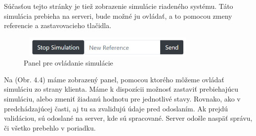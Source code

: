 Súčasťou tejto stránky je tiež zobrazenie simulácie riadeného systému. Táto simulácia prebieha na serveri, bude možné ju ovládať, a to pomocou zmeny referencie a zastavovacieho tlačidla.
\begin{figure}[H]	
	\centering
	\includegraphics[width=9cm,height=1cm]{images/ovladanie_simulacie}
	\caption{Panel pre ovládanie simulácie}
\end{figure}
Na (Obr. 4.4) máme zobrazený panel, pomocou ktorého môžeme ovládať simuláciu zo strany klienta. Máme k dispozícii možnosť zastaviť prebiehajúcu simuláciu, alebo zmeniť žiadanú hodnotu pre jednotlivé stavy. Rovnako, ako v predchádzajúcej časti, aj tu sa zvalidujú údaje pred odoslaním. Ak prejdú validáciou, sú odoslané na server, kde sú spracované. Server odošle naspäť správu, či všetko prebehlo v poriadku.

